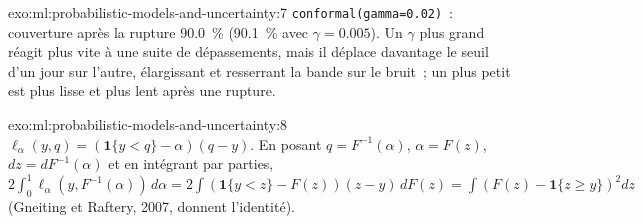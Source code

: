 \begin{solution}{exo:ml:probabilistic-models-and-uncertainty:7}
\texttt{conformal(gamma=0.02)}~: couverture après la rupture 90.0~\% (90.1~\% avec $\gamma = 0.005$). Un $\gamma$ plus grand réagit plus vite
à une suite de dépassements, mais il déplace davantage le seuil d'un jour sur l'autre, élargissant et resserrant la bande sur le bruit~; un
plus petit est plus lisse et plus lent après une rupture.
\end{solution}

\begin{solution}{exo:ml:probabilistic-models-and-uncertainty:8}
$\ell_\alpha(y, q) = (\mathbf 1\{y < q\} - \alpha)(q - y)$. En posant $q = F^{-1}(\alpha)$, $\alpha = F(z)$, $dz =
dF^{-1}(\alpha)$ et en intégrant par parties, $2\int_0^1\ell_\alpha(y, F^{-1}(\alpha))\,d\alpha = 2\int(\mathbf 1\{y < z\} -
F(z))(z - y)\,dF(z) = \int(F(z) - \mathbf 1\{z\ge y\})^2dz$ (Gneiting et Raftery, 2007, donnent l'identité).
\end{solution}

